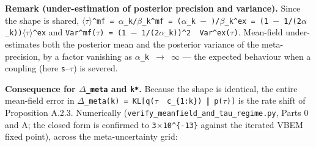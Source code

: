 \documentclass{article}
\begin{document}
\textbf{Remark (under-estimation of posterior precision and variance).}
Since the shape is shared,
\texttt{\ensuremath{\langle}\ensuremath{\tau}\ensuremath{\rangle}\^{}mf\ =\ \ensuremath{\alpha}\_k/\ensuremath{\beta}\_k\^{}mf\ =\ (\ensuremath{\alpha}\_k\ \ensuremath{-}\ \textonehalf{})/\ensuremath{\beta}\_k\^{}ex\ =\ (1\ \ensuremath{-}\ 1/(2\ensuremath{\alpha}\_k))\textperiodcentered{}\ensuremath{\langle}\ensuremath{\tau}\ensuremath{\rangle}\^{}ex}
and \texttt{Var\^{}mf(\ensuremath{\tau})\ =\ (1\ \ensuremath{-}\ 1/(2\ensuremath{\alpha}\_k))\^{}2\ \textperiodcentered{}\ Var\^{}ex(\ensuremath{\tau})}.
Mean-field under-estimates both the posterior mean and the posterior
variance of the meta-precision, by a factor vanishing as
\texttt{\ensuremath{\alpha}\_k\ \ensuremath{\rightarrow}\ \ensuremath{\infty}} --- the expected behaviour when a coupling (here
\texttt{s}--\texttt{\ensuremath{\tau}}) is severed.

\textbf{Consequence for \texttt{\ensuremath{\Delta}\_meta} and \texttt{k*}.} Because the
shape is identical, the entire mean-field error in
\texttt{\ensuremath{\Delta}\_meta(k)\ =\ KL{[}q(\ensuremath{\tau}\ \textbar{}\ c\_\{1:k\})\ \ensuremath{\Vert}\ p(\ensuremath{\tau}){]}} is
the rate shift of Proposition A.2.3. Numerically
(\texttt{verify\_meanfield\_and\_tau\_regime.py}, Parts 0 and A; the
closed form is confirmed to \texttt{3\ensuremath{\times}10\^{}\{-13\}} against the
iterated VBEM fixed point), across the meta-uncertainty grid:
\end{document}
